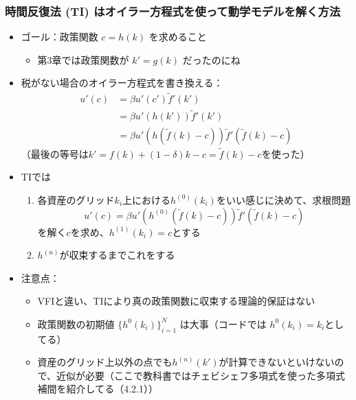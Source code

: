 \documentclass[unicode,9pt]{beamer}%
\begin{document}

\begin{frame}\frametitle{時間反復法 (TI) はオイラー方程式を使って動学モデルを解く方法}
  \begin{itemize}
    \item ゴール：政策関数 $c = h(k)$ を求めること
      \begin{itemize}
        \item 第3章では政策関数が $k' = g(k)$ だったのにね
      \end{itemize}
    \item 税がない場合のオイラー方程式を書き換える：
      \begin{align*}
        u'(c) 
        &= \beta u'(c') \tilde{f}'(k')  \\
        &= \beta u'(h(k')) \tilde{f}'(k') \\
        &= \beta u'(h(\tilde{f}(k) - c)) \tilde{f}'(\tilde{f}(k) - c) 
      \end{align*}
      （最後の等号は$k' = f(k) + (1 - \delta)k - c = \tilde{f}(k) - c$を使った）
    \item TIでは
      \begin{enumerate}
        \item 各資産のグリッド$k_i$上における$h^{(0)}(k_i)$をいい感じに決めて、求根問題
          $$
            u'(c) = \beta u'(h^{(0)}(\tilde{f}(k) - c)) \tilde{f}'(\tilde{f}(k) - c) 
          $$
          を解く$c$を求め、$h^{(1)}(k_i) = c$とする
        \item $h^{(n)}$が収束するまでこれをする
      \end{enumerate}
    \item 注意点：
      \begin{itemize}
          \item VFIと違い、TIにより真の政策関数に収束する理論的保証はない
          \item 政策関数の初期値 $\{h^{0}(k_i) \}_{i=1}^N$ は大事（コードでは $h^{0}(k_i) = k_i$としてる）
          \item 資産のグリッド上以外の点でも$h^{(n)}(k')$が計算できないといけないので、近似が必要（ここで教科書ではチェビシェフ多項式を使った多項式補間を紹介してる（4.2.1））
      \end{itemize}
  \end{itemize}
\end{frame}
\end{document}
